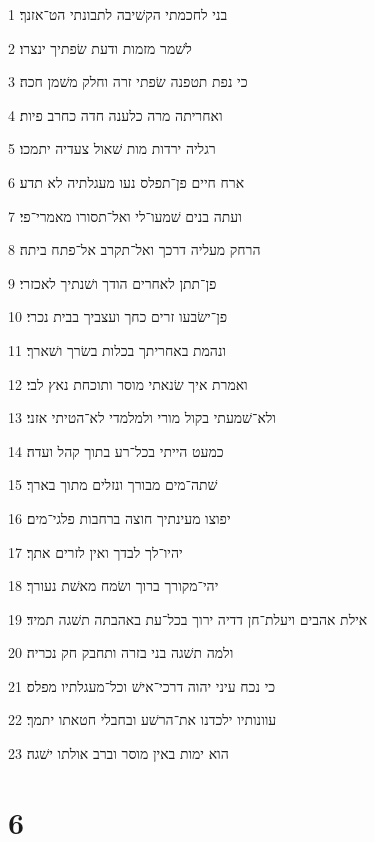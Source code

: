 \par 1 בני לחכמתי הקשׁיבה לתבונתי הט־אזנך׃
\par 2 לשׁמר מזמות ודעת שׂפתיך ינצרו׃
\par 3 כי נפת תטפנה שׂפתי זרה וחלק משׁמן חכה׃
\par 4 ואחריתה מרה כלענה חדה כחרב פיות׃
\par 5 רגליה ירדות מות שׁאול צעדיה יתמכו׃
\par 6 ארח חיים פן־תפלס נעו מעגלתיה לא תדע׃
\par 7 ועתה בנים שׁמעו־לי ואל־תסורו מאמרי־פי׃
\par 8 הרחק מעליה דרכך ואל־תקרב אל־פתח ביתה׃
\par 9 פן־תתן לאחרים הודך ושׁנתיך לאכזרי׃
\par 10 פן־ישׂבעו זרים כחך ועצביך בבית נכרי׃
\par 11 ונהמת באחריתך בכלות בשׂרך ושׁארך׃
\par 12 ואמרת איך שׂנאתי מוסר ותוכחת נאץ לבי׃
\par 13 ולא־שׁמעתי בקול מורי ולמלמדי לא־הטיתי אזני׃
\par 14 כמעט הייתי בכל־רע בתוך קהל ועדה׃
\par 15 שׁתה־מים מבורך ונזלים מתוך בארך׃
\par 16 יפוצו מעינתיך חוצה ברחבות פלגי־מים׃
\par 17 יהיו־לך לבדך ואין לזרים אתך׃
\par 18 יהי־מקורך ברוך ושׂמח מאשׁת נעורך׃
\par 19 אילת אהבים ויעלת־חן דדיה ירוך בכל־עת באהבתה תשׁגה תמיד׃
\par 20 ולמה תשׁגה בני בזרה ותחבק חק נכריה׃
\par 21 כי נכח עיני יהוה דרכי־אישׁ וכל־מעגלתיו מפלס׃
\par 22 עוונותיו ילכדנו את־הרשׁע ובחבלי חטאתו יתמך׃
\par 23 הוא ימות באין מוסר וברב אולתו ישׁגה׃

\chapter{6}

